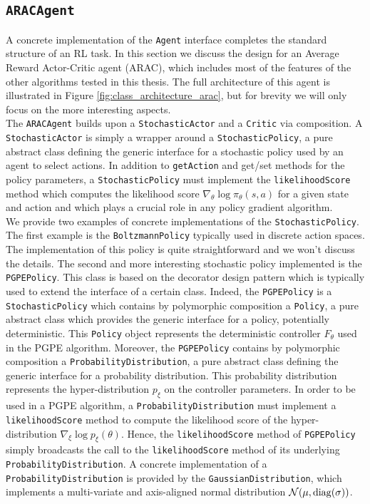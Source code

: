 \subsection{\lstinline{ARACAgent}}
A concrete implementation of the \lstinline{Agent} interface completes the standard structure of an RL task. In this section we discuss the design for an Average Reward Actor-Critic agent (ARAC), which includes most of the features of the other algorithms tested in this thesis. The full architecture of this agent is illustrated in Figure \ref{fig:class_architecture_arac}, but for brevity we will only focus on the more interesting aspects.\\
The \lstinline{ARACAgent} builds upon a \lstinline{StochasticActor} and a \lstinline{Critic} via composition. A \lstinline{StochasticActor} is simply a wrapper around a \lstinline{StochasticPolicy}, a pure abstract class defining the generic interface for a stochastic policy used by an agent to select actions. In addition to \lstinline{getAction} and get/set methods for the policy parameters, a \lstinline{StochasticPolicy} must implement the \lstinline{likelihoodScore} method which computes the likelihood score $\nabla_\theta \log \pi_\theta(s,a)$ for a given state and action and which plays a crucial role in any policy gradient algorithm.\\
We provide two examples of concrete implementations of the \lstinline{StochasticPolicy}. The first example is the \lstinline{BoltzmannPolicy} typically used in discrete action spaces. The implementation of this policy is quite straightforward and we won't discuss the details. The second and more interesting stochastic policy implemented is the \lstinline{PGPEPolicy}. This class is based on the decorator design pattern which is typically used to extend the interface of a certain class. Indeed, the \lstinline{PGPEPolicy} is a \lstinline{StochasticPolicy} which contains by polymorphic composition a \lstinline{Policy}, a pure abstract class which provides the generic interface for a policy, potentially deterministic. This \lstinline{Policy} object represents the deterministic controller $F_\theta$ used in the PGPE algorithm. Moreover, the \lstinline{PGPEPolicy} contains by polymorphic composition a \lstinline{ProbabilityDistribution}, a pure abstract class defining the generic interface for a probability distribution. This probability distribution represents the hyper-distribution $p_\xi$ on the controller parameters. In order to be used in a PGPE algorithm, a \lstinline{ProbabilityDistribution} must implement a \lstinline{likelihoodScore} method to compute the likelihood score of the hyper-distribution $\nabla_\xi \log p_\xi(\theta)$. Hence, the \lstinline{likelihoodScore} method of \lstinline{PGPEPolicy} simply broadcasts the call to the \lstinline{likelihoodScore} method of its underlying \lstinline{ProbabilityDistribution}. A concrete implementation of a \lstinline{ProbabilityDistribution} is provided by the \lstinline{GaussianDistribution}, which implements a multi-variate and axis-aligned normal distribution $\mathcal{N}(\mu, \operatorname{diag}(\sigma))$.\\
